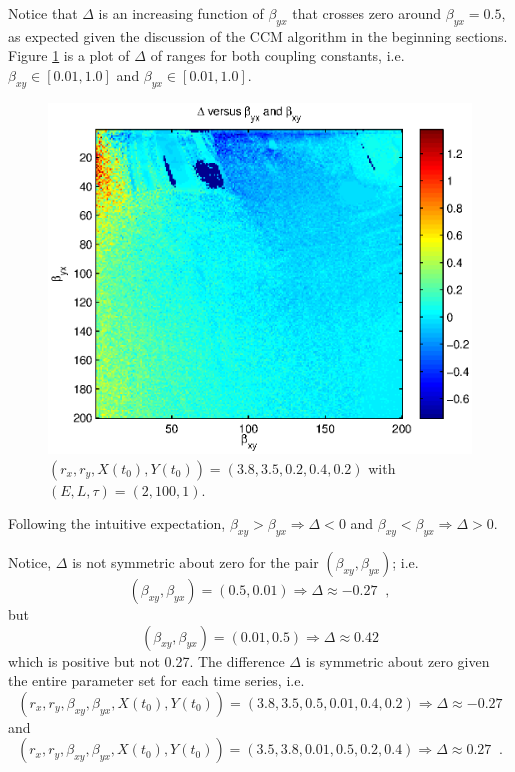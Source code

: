 \documentclass[a4paper,11pt]{article}
\begin{document}
Notice that $\Delta$ is an increasing function of $\beta_{yx}$ that crosses zero around $\beta_{yx}=0.5$, as expected given the discussion of the CCM algorithm in the beginning sections.  Figure \ref{fig:CxyCyxVByxBxy_diff} is a plot of $\Delta$ of ranges for both coupling constants, i.e.\ $\beta_{xy}\in[0.01,1.0]$ and $\beta_{yx}\in[0.01,1.0]$.
\begin{figure}[h!t]
\centering
\label{fig:CxyCyxVByxBxy_diff}
\includegraphics[scale=0.55]{graphics/CxyCyxVByxBxy_diff.eps}
\caption{$\left(r_x,r_y,X(t_0),Y(t_0)\right) = \left(3.8,3.5,0.2,0.4,0.2\right)$ with $\left(E,L,\tau\right)=\left(2,100,1\right)$.}
\end{figure}
Following the intuitive expectation, $\beta_{xy}>\beta_{yx}\Rightarrow \Delta<0$ and $\beta_{xy}<\beta_{yx}\Rightarrow \Delta>0$.

Notice, $\Delta$ is not symmetric about zero for the pair $(\beta_{xy},\beta_{yx})$; i.e.\
$$
\left(\beta_{xy},\beta_{yx}\right) = \left(0.5,0.01\right) \Rightarrow \Delta \approx -0.27\;\;,
$$
but
$$
\left(\beta_{xy},\beta_{yx}\right) = \left(0.01,0.5\right) \Rightarrow \Delta \approx 0.42
$$
which is positive but not 0.27.  The difference $\Delta$ is symmetric about zero given the entire parameter set for each time series, i.e.\
$$
\left(r_x,r_y,\beta_{xy},\beta_{yx},X(t_0),Y(t_0)\right) = \left(3.8,3.5,0.5,0.01,0.4,0.2\right) \Rightarrow \Delta \approx -0.27
$$
and
$$
\left(r_x,r_y,\beta_{xy},\beta_{yx},X(t_0),Y(t_0)\right) = \left(3.5,3.8,0.01,0.5,0.2,0.4\right) \Rightarrow \Delta \approx 0.27\;\;.
$$
\end{document}
